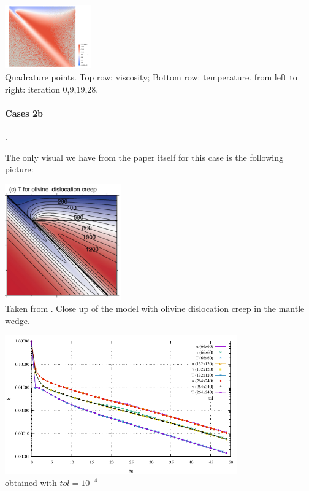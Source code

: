 \begin{center}
\includegraphics[width=3.74cm]{python_codes/fieldstone_68/results/case2a/T0028}\\
{\captionfont Quadrature points. Top row: viscosity; Bottom row: temperature.
from left to right: iteration 0,9,19,28.}
\end{center}


\paragraph{Cases 2b}.

The only visual we have from the paper itself for this case is the following picture:

\begin{center}
\includegraphics[width=5cm]{python_codes/fieldstone_68/images/fig4c}\\
{\captionfont Taken from \cite{vack08}. Close up of the model with olivine dislocation creep in the mantle wedge.}
\end{center}

\begin{center}
\includegraphics[width=10cm]{python_codes/fieldstone_68/results/case2b/conv.pdf}\\
{\captionfont obtained with $tol=10^{-4}$}
\end{center}


